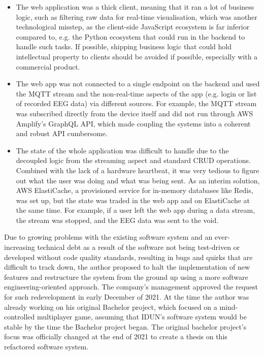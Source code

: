 \begin{itemize}
\item The web application was a thick client, meaning that it ran a lot of business logic, such as filtering raw data for real-time visualisation, which was another technological misstep, as the client-side JavaScript ecosystem is far inferior compared to, e.g. the Python ecosystem that could run in the backend to handle such tasks. If possible, shipping business logic that could hold intellectual property to clients should be avoided if possible, especially with a commercial product.
\item The web app was not connected to a single endpoint on the backend and used the MQTT stream and the non-real-time aspects of the app (e.g. login or list of recorded EEG data) via different sources. For example, the MQTT stream was subscribed directly from the device itself and did not run through AWS Amplify's GraphQL API, which made coupling the systems into a coherent and robust API cumbersome.
\item The state of the whole application was difficult to handle due to the decoupled logic from the streaming aspect and standard CRUD operations. Combined with the lack of a hardware heartbeat, it was very tedious to figure out what the user was doing and what was being sent. As an interim solution, AWS ElastiCache, a provisioned service for in-memory databases like Redis, was set up, but the state was traded in the web app and on ElastiCache at the same time. For example, if a user left the web app during a data stream, the stream was stopped, and the EEG data was sent to the void.
\end{itemize}

Due to growing problems with the existing software system and an ever-increasing technical debt as a result of the software not being test-driven or developed without code quality standards, resulting in bugs and quirks that are difficult to track down, the author proposed to halt the implementation of new features and restructure the system from the ground up using a more software engineering-oriented approach. The company's management approved the request for such redevelopment in early December of 2021. At the time the author was already working on his original Bachelor project, which focused on a mind-controlled multiplayer game, assuming that IDUN's software system would be stable by the time the Bachelor project began. The original bachelor project's focus was officially changed at the end of 2021 to create a thesis on this refactored software system.


